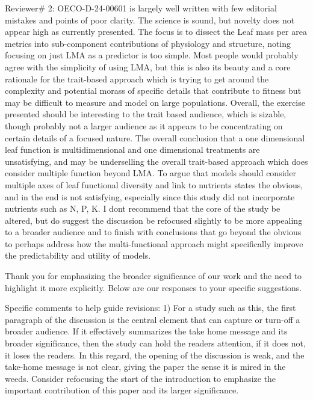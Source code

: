\documentclass[
  12pt,
  letterpaper,
  DIV=11,
  numbers=noendperiod]{scrartcl}
\renewenvironment{quote}
  {\begin{customblockquote}\color{blockquote-text}\ignorespaces}
  {\end{customblockquote}}
\begin{document}
\begin{quote}
Reviewer\# 2: OECO-D-24-00601 is largely well written with few editorial
mistakes and points of poor clarity. The science is sound, but novelty
does not appear high as currently presented. The focus is to dissect the
Leaf mass per area metrics into sub-component contributions of
physiology and structure, noting focusing on just LMA as a predictor is
too simple. Most people would probably agree with the simplicity of
using LMA, but this is also its beauty and a core rationale for the
trait-based approach which is trying to get around the complexity and
potential morass of specific details that contribute to fitness but may
be difficult to measure and model on large populations. Overall, the
exercise presented should be interesting to the trait based audience,
which is sizable, though probably not a larger audience as it appears to
be concentrating on certain details of a focused nature. The overall
conclusion that a one dimensional leaf function is multidimensional and
one dimensional treatments are unsatisfying, and may be underselling the
overall trait-based approach which does consider multiple function
beyond LMA. To argue that models should consider multiple axes of leaf
functional diversity and link to nutrients states the obvious, and in
the end is not satisfying, especially since this study did not
incorporate nutrients such as N, P, K. I dont recommend that the core of
the study be altered, but do suggest the discussion be refocused
slightly to be more appealing to a broader audience and to finish with
conclusions that go beyond the obvious to perhaps address how the
multi-functional approach might specifically improve the predictability
and utility of models.
\end{quote}

Thank you for emphasizing the broader significance of our work and the
need to highlight it more explicitly. Below are our responses to your
specific suggestions.

\begin{quote}
Specific comments to help guide revisions: 1) For a study such as this,
the first paragraph of the discussion is the central element that can
capture or turn-off a broader audience. If it effectively summarizes the
take home message and its broader significance, then the study can hold
the readers attention, if it does not, it loses the readers. In this
regard, the opening of the discussion is weak, and the take-home message
is not clear, giving the paper the sense it is mired in the weeds.
Consider refocusing the start of the introduction to emphasize the
important contribution of this paper and its larger significance.
\end{quote}
\end{document}

